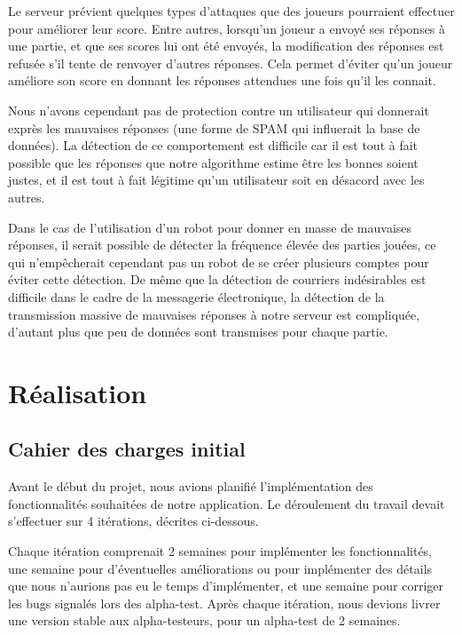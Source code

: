 \documentclass[a4paper,11pt,french]{article}
\begin{document}
{Le serveur prévient quelques types d'attaques que des joueurs pourraient effectuer pour améliorer leur score. Entre autres, lorsqu'un joueur
a envoyé ses réponses à une partie, et que ses scores lui ont été envoyés, la modification des réponses est refusée s'il tente de renvoyer
d'autres réponses. Cela permet d'éviter qu'un joueur améliore son score en donnant les réponses attendues une fois qu'il les connait.

Nous n'avons cependant pas de protection contre un utilisateur qui donnerait exprès les mauvaises réponses (une forme de SPAM qui influerait
la base de données). La détection de ce comportement est difficile car il est tout à fait possible que les réponses que notre algorithme
estime être les bonnes soient justes, et il est tout à fait légitime qu'un utilisateur soit en désacord avec les autres.

Dans le cas de l'utilisation d'un robot pour donner en masse de mauvaises réponses, il serait possible de détecter la fréquence élevée des
parties jouées, ce qui n'empêcherait cependant pas un robot de se créer plusieurs comptes pour éviter cette détection. De même que la
détection de courriers indésirables est difficile dans le cadre de la messagerie électronique, la détection de la transmission massive de
mauvaises réponses à notre serveur est compliquée, d'autant plus que peu de données sont transmises pour chaque partie.

\section{Réalisation}
\subsection{Cahier des charges initial}
Avant le début du projet, nous avions planifié l'implémentation des fonctionnalités souhaitées de notre application. Le déroulement du
travail devait s'effectuer sur 4 itérations, décrites ci-dessous.

Chaque itération comprenait 2 semaines pour implémenter les fonctionnalités, une semaine pour d'éventuelles améliorations ou pour
implémenter des détails que nous n'aurions pas eu le temps d'implémenter, et une semaine pour corriger les bugs signalés lors des
alpha-test. Après chaque itération, nous devions livrer une version stable aux alpha-testeurs, pour un alpha-test de 2 semaines.

}
\end{document}
